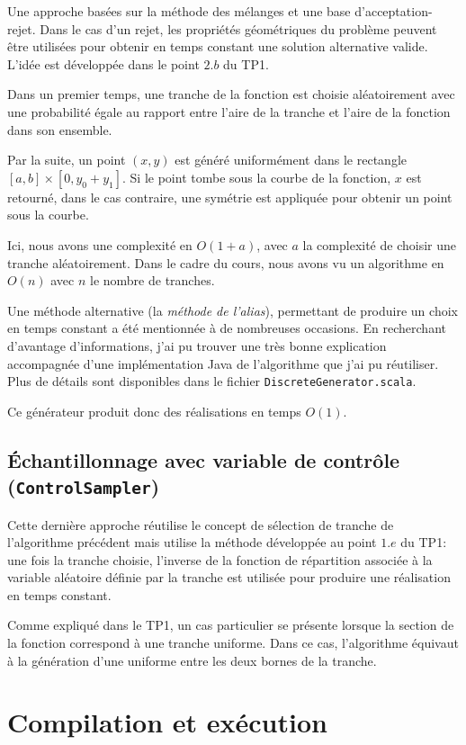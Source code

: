 \documentclass[a4paper,11pt]{article}
\begin{document}
Une approche basées sur la méthode des mélanges et une base d'acceptation-rejet. Dans le cas d'un rejet, les propriétés géométriques du problème peuvent être utilisées pour obtenir en temps constant une solution alternative valide. L'idée est développée dans le point $2.b$ du TP1.

Dans un premier temps, une tranche de la fonction est choisie aléatoirement avec une probabilité égale au rapport entre l'aire de la tranche et l'aire de la fonction dans son ensemble.

Par la suite, un point $(x, y)$ est généré uniformément dans le rectangle $[a, b]\times[0,y_0+y_1]$. Si le point tombe sous la courbe de la fonction, $x$ est retourné, dans le cas contraire, une symétrie est appliquée pour obtenir un point sous la courbe. 

Ici, nous avons une complexité en $O(1 + a)$, avec $a$ la complexité de choisir une tranche aléatoirement. Dans le cadre du cours, nous avons vu un algorithme en $O(n)$ avec $n$ le nombre de tranches.

Une méthode alternative (la \emph{méthode de l'alias}), permettant de produire un choix en temps constant a été mentionnée à de nombreuses occasions. En recherchant d'avantage d'informations, j'ai pu trouver une très bonne explication accompagnée d'une implémentation Java de l'algorithme que j'ai pu réutiliser. Plus de détails sont disponibles dans le fichier \texttt{DiscreteGenerator.scala}.

Ce générateur produit donc des réalisations en temps $O(1)$.

\subsection{Échantillonnage avec variable de contrôle {\normalfont({\tt ControlSampler})}}

Cette dernière approche réutilise le concept de sélection de tranche de l'algorithme précédent mais utilise la méthode développée au point $1.e$ du TP1: une fois la tranche choisie, l'inverse de la fonction de répartition associée à la variable aléatoire définie par la tranche est utilisée pour produire une réalisation en temps constant.

Comme expliqué dans le TP1, un cas particulier se présente lorsque la section de la fonction correspond à une tranche uniforme. Dans ce cas, l'algorithme équivaut à la génération d'une uniforme entre les deux bornes de la tranche. 

\section{Compilation et exécution}
\end{document}
